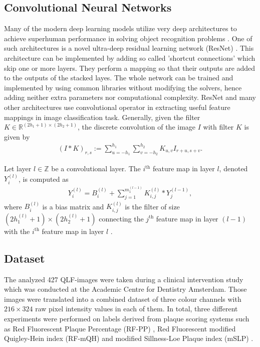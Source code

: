 \documentclass[runningheads,a4paper]{llncs}
\begin{document}
\subsection{Convolutional Neural Networks}
Many of the modern deep learning models utilize very deep architectures to achieve superhuman performance in solving object recognition problems \cite{simonyan2014very,szegedy2015going}. One of such architectures is a novel ultra-deep residual learning network (ResNet) \cite{he2016deep}. This architecture can be implemented by adding so called 'shortcut connections' \cite{he2016identity} which skip one or more layers. They perform a mapping so that their outputs are added to the outputs of the stacked layes. The whole network can be trained and implemented by using common libraries without modifying the solvers, hence adding neither extra parameters nor computational complexity. ResNet and many other architectures \cite{jarrett2009best,lecun2010convolutional} use convolutional operator in extracting useful feature mappings in image classification task. Generally, given the filter $K \in \mathbb{R}^{(2h_1+1) \times (2h_2+1)}$, the discrete convolution of the image $I$ with filter $K$ is given by
\begin{align}
	\label{eq:convolution}
	\left(I \ast K\right)_{r,s} := \sum _{u = -h_1} ^{h_1} \sum _{v = -h_2}^{h_2} K_{u,v} I_{r+u,s+v}.
\end{align}

Let layer $l \in \mathbb{Z}$ be a convolutional layer. The $i^{\text{th}}$ feature map in layer $l$, denoted $Y_i^{(l)}$, is computed as
\begin{align}
	\label{eq:convolutional-layer}
	Y_i^{(l)} = B^{(l)}_{i} + \sum _{j = 1}^{m_1^{(l-1)}} K^{(l)}_{i,j} \ast Y_j^{(l-1)},
\end{align}
where $B_i^{(l)}$ is a bias matrix and $K^{(l)}_{i,j}$ is the filter of size $(2h_1^{(l)} + 1) \times (2h_2^{(l)} + 1)$ connecting the $j^{\text{th}}$ feature map in layer $(l-1)$ with the $i^{\text{th}}$ feature map in layer $l$ \cite{lecun2010convolutional}.

\subsection{Dataset}
The analyzed 427 QLF-images were taken during a clinical intervention study \cite{van2016dynamics} which was conducted at the Academic Centre for Dentistry Amsterdam. Those images were translated into a combined dataset of three colour channels with $216\times324$ raw pixel intensity values in each of them. In total, three different experiments were performed on labels derived from plaque scoring systems such as Red Fluorescent Plaque Percentage (RF-PP) \cite{van2016dynamics}, Red Fluorescent modified Quigley-Hein index (RF-mQH) \cite{volgenant2016comparison} and modified Sillness-Loe Plaque index (mSLP) \cite{weijden1993comparative}.
\end{document}
